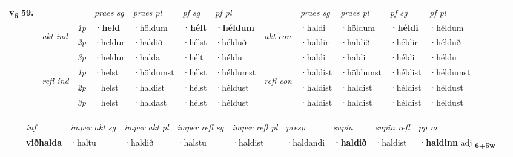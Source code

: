 \begin{tabular}{llllllllllll} \toprule
\multirow{4}{*}{{{\textbf{v{\textsubscript{6}}} \Large{\textbf{59.}}}}}  & &   &  \textit{praes sg}  & \textit{praes pl}  &\textit{ pf sg} & \textit{pf pl} &  &  \textit{praes sg}  & \textit{praes pl}  & \textit{pf sg} & \textit{pf pl } \\*
	\cmidrule{4-7} \cmidrule{9-12}
 & \multirow{3}{*}{\begin{turn}{90}\textit{akt ind}\end{turn}} & {\textit{1p}} & \textbf{·held} & ·höldum    & \textbf{·hélt} & \textbf{·héldum} & \multirow{3}{*}{\begin{turn}{90}\textit{akt con}\end{turn}} &·haldi & ·höldum & \textbf{·héldi} & ·héldum\\*
& &  {\textit{2p}} &  ·heldur  & ·haldið   & ·hélst & ·hélduð & & ·haldir & ·haldið & ·héldir & ·hélduð \\*
& &  {\textit{3p}} & ·heldur & ·halda   & ·hélt & ·héldu & & ·haldi & ·haldi& ·héldi & ·héldu  \\*
\cmidrule{4-7} \cmidrule{9-12}
 &\multirow{3}{*}{\begin{turn}{90}\textit{refl ind}\end{turn}} & {\textit{1p}} & ·helst & ·höldumst    & ·hélst & ·héldumst & \multirow{3}{*}{\begin{turn}{90}\textit{refl con}\end{turn}}  &·haldist & ·höldumst & ·héldist & ·héldumst\\*
 &&  {\textit{2p}} &  ·helst  & ·haldist   & ·hélst & ·héldust & &·haldist & ·haldist & ·héldist & ·héldust \\*
& &  {\textit{3p}} & ·helst & ·haldast   & ·hélst & ·héldust & & ·haldist & ·haldist& ·héldist & ·héldust  \\*
\cmidrule{4-7} \cmidrule{9-12}
\end{tabular}


\begin{tabular}{llllllllllll}
 & & \textit{inf} & \textit{imper akt sg} & \textit{imper akt pl} & \textit{imper refl sg} & \textit{imper refl pl} & \textit{presp} & \textit{supin} & \textit{supin refl} & \textit{pp m}     \\*
  & & \textbf{viðhalda} & ·haltu  & ·haldið & ·halstu & ·haldist & ·haldandi &  \textbf{·haldið} & ·haldist & \textbf{·haldinn} adj \textbf{\textsubscript{6+5w}} \\*
\cmidrule{1-12}
\end{tabular}



